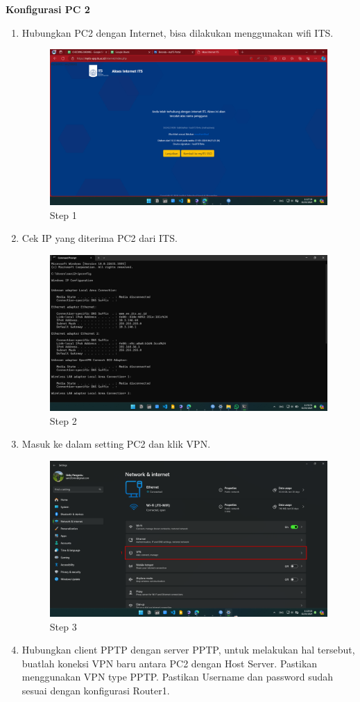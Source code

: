 \begin{center}
    \textbf{Konfigurasi PC 2}
    \begin{enumerate}
        \item Hubungkan PC2 dengan Internet, bisa dilakukan menggunakan wifi ITS.
        \begin{figure}[H]
			\centering
			\includegraphics[width=0.5\linewidth]{P4/img/pc2/Step 1.png}
			\caption{Step 1}
			\label{fig:Step 1(PC 2)}
		\end{figure}
        \item Cek IP yang diterima PC2 dari ITS.
        \begin{figure}[H]
			\centering
			\includegraphics[width=0.5\linewidth]{P4/img/pc2/Step 2.png}
			\caption{Step 2}
			\label{fig:Step 2(PC 2)}
        \end{figure}
        \item Masuk ke dalam setting PC2 dan klik VPN.
        \begin{figure}[H]
			\centering
			\includegraphics[width=0.8\linewidth]{P4/img/pc2/Step 3.png}
			\caption{Step 3}
			\label{fig:Step 3(PC 2)}
		\end{figure}
        \item Hubungkan client PPTP dengan server PPTP, untuk melakukan hal tersebut, buatlah koneksi VPN baru antara PC2 dengan Host Server. Pastikan menggunakan VPN type PPTP. Pastikan Username dan password sudah sesuai dengan konfigurasi Router1.

\end{enumerate}
\end{center}
